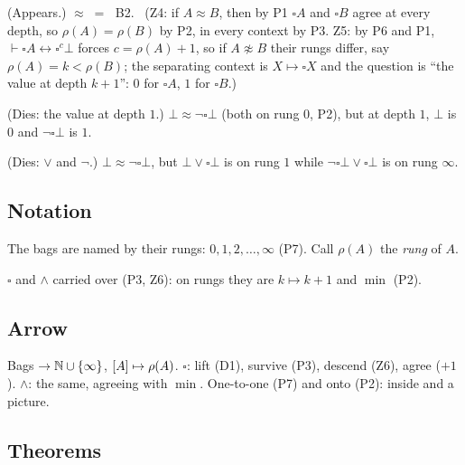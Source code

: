 \begin{lines}
\item[\lab{P7}] (Appears.) $\approx \;=\;$ B2. \ (Z4: if $A \approx B$, then by P1 $\square A$ and $\square B$ agree at every depth, so $\rho(A) = \rho(B)$ by P2, in every context by P3. Z5: by P6 and P1, $\vdash \square A \leftrightarrow \square^{c}\bot$ forces $c = \rho(A) + 1$, so if $A \not\approx B$ their rungs differ, say $\rho(A) = k < \rho(B)$; the separating context is $X \mapsto \square X$ and the question is ``the value at depth $k + 1$'': $0$ for $\square A$, $1$ for $\square B$.)
\item[\lab{P8}] (Dies: the value at depth $1$.) $\bot \approx \neg\square\bot$ (both on rung $0$, P2), but at depth $1$, $\bot$ is $0$ and $\neg\square\bot$ is $1$.
\item[\lab{P9}] (Dies: $\vee$ and $\neg$.) $\bot \approx \neg\square\bot$, but $\bot \vee \square\bot$ is on rung $1$ while $\neg\square\bot \vee \square\bot$ is on rung $\infty$.
\end{lines}

\subsection*{Notation}

\begin{lines}
\item[\lab{N1}] The bags are named by their rungs: $0, 1, 2, \dots, \infty$ (P7). Call $\rho(A)$ the \emph{rung} of $A$.
\item[\lab{N2}] $\square$ and $\wedge$ carried over (P3, Z6): on rungs they are $k \mapsto k + 1$ and $\min$ (P2).
\end{lines}

\subsection*{Arrow}

\begin{lines}
\item[\lab{P10}] Bags $\to \mathbb{N} \cup \{\infty\}$, $[A] \mapsto \rho(A)$. $\square$: lift (D1), survive (P3), descend (Z6), agree ($+1$). $\wedge$: the same, agreeing with $\min$. One-to-one (P7) and onto (P2): inside and a picture.
\end{lines}

\subsection*{Theorems}

